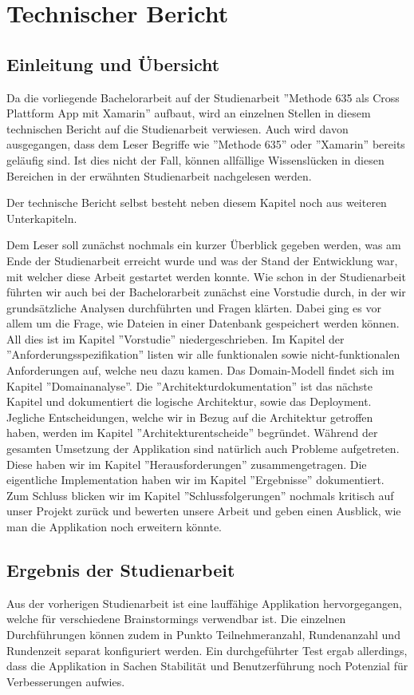 \section{Technischer Bericht}

\subsection{Einleitung und Übersicht}
Da die vorliegende Bachelorarbeit auf der Studienarbeit ''Methode 635 als Cross Plattform App mit Xamarin'' \cite{methode635-sa} aufbaut, wird an einzelnen Stellen in diesem technischen Bericht auf die Studienarbeit verwiesen. Auch wird davon ausgegangen, dass dem Leser Begriffe wie ''Methode 635'' oder ''Xamarin'' bereits geläufig sind. Ist dies nicht der Fall, können allfällige Wissenslücken in diesen Bereichen in der erwähnten Studienarbeit nachgelesen werden.

Der technische Bericht selbst besteht neben diesem Kapitel noch aus weiteren Unterkapiteln. 

Dem Leser soll zunächst nochmals ein kurzer Überblick gegeben werden, was am Ende der Studienarbeit erreicht wurde und was der Stand der Entwicklung war, mit welcher diese Arbeit gestartet werden konnte. Wie schon in der Studienarbeit führten wir auch bei der Bachelorarbeit zunächst eine Vorstudie durch, in der wir grundsätzliche Analysen durchführten und Fragen klärten. Dabei ging es vor allem um die Frage, wie Dateien in einer Datenbank gespeichert werden können. All dies ist im Kapitel ''Vorstudie'' niedergeschrieben. Im Kapitel der ''Anforderungsspezifikation'' listen wir alle funktionalen sowie nicht-funktionalen Anforderungen auf, welche neu dazu kamen. Das Domain-Modell findet sich im Kapitel ''Domainanalyse''. Die ''Architektur\-dokumentation'' ist das nächste Kapitel und dokumentiert die logische Architektur, sowie das Deployment. Jegliche Entscheidungen, welche wir in Bezug auf die Architektur getroffen haben, werden im Kapitel ''Architekturentscheide'' begründet. Während der gesamten Umsetzung der Applikation sind natürlich auch Probleme aufgetreten. Diese haben wir im Kapitel ''Herausforderungen'' zusammengetragen. Die eigentliche Implementation haben wir im Kapitel ''Ergebnisse'' dokumentiert. Zum Schluss blicken wir im Kapitel ''Schlussfolgerungen'' nochmals kritisch auf unser Projekt zurück und bewerten unsere Arbeit und geben einen Ausblick, wie man die Applikation noch erweitern könnte.

\subsection{Ergebnis der Studienarbeit}
Aus der vorherigen Studienarbeit ist eine lauffähige Applikation hervorgegangen, welche für verschiedene Brainstormings verwendbar ist. Die einzelnen Durchführungen können zudem in Punkto Teilnehmeranzahl, Rundenanzahl und Rundenzeit separat konfiguriert werden. Ein durchgeführter Test ergab allerdings, dass die Applikation in Sachen Stabilität und Benutzerführung noch Potenzial für Verbesserungen aufwies.

